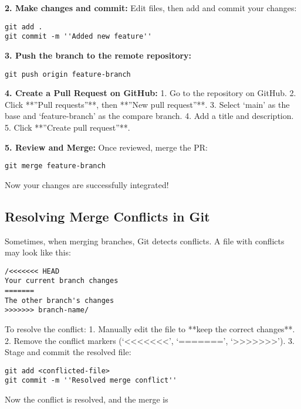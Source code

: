 \textbf{2. Make changes and commit:}
Edit files, then add and commit your changes:
\begin{lstlisting}
git add .
git commit -m ''Added new feature''
\end{lstlisting}

\textbf{3. Push the branch to the remote repository:}
\begin{lstlisting}
git push origin feature-branch
\end{lstlisting}

\textbf{4. Create a Pull Request on GitHub:}
1. Go to the repository on GitHub.
2. Click **''Pull requests''**, then **''New pull request''**.
3. Select `main' as the base and `feature-branch' as the compare branch.
4. Add a title and description.
5. Click **''Create pull request''**.

\textbf{5. Review and Merge:}
Once reviewed, merge the PR:\\
\begin{lstlisting}
git merge feature-branch
\end{lstlisting}

Now your changes are successfully integrated!

\subsection{Resolving Merge Conflicts in Git}

Sometimes, when merging branches, Git detects conflicts. A file with conflicts may look like this:

\begin{lstlisting}
/<<<<<<< HEAD
Your current branch changes
=======
The other branch's changes
>>>>>>> branch-name/
\end{lstlisting}

To resolve the conflict:
1. Manually edit the file to **keep the correct changes**.
2. Remove the conflict markers (`\textless\textless\textless\textless\textless\textless\textless', `=======', `\textgreater\textgreater\textgreater\textgreater\textgreater\textgreater\textgreater').
3. Stage and commit the resolved file:
\begin{lstlisting}
git add <conflicted-file>
git commit -m ''Resolved merge conflict''
\end{lstlisting}

Now the conflict is resolved, and the merge is 

